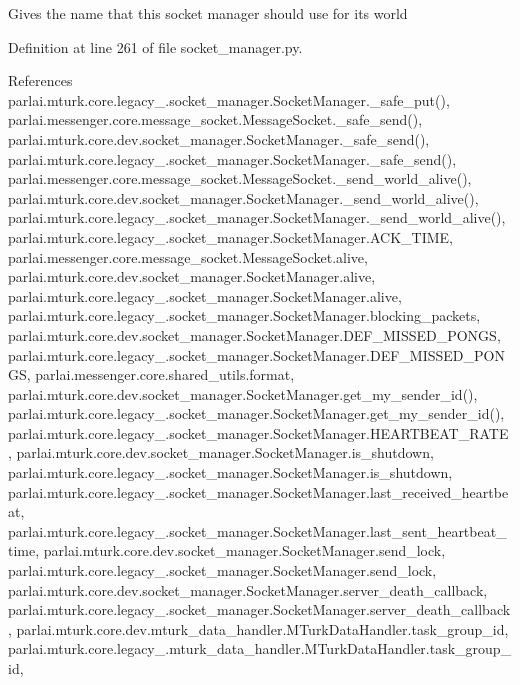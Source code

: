 \begin{DoxyVerb}Gives the name that this socket manager should use for its world\end{DoxyVerb}
 

Definition at line 261 of file socket\+\_\+manager.\+py.



References parlai.\+mturk.\+core.\+legacy\+\_.\+socket\+\_\+manager.\+Socket\+Manager.\+\_\+safe\+\_\+put(), parlai.\+messenger.\+core.\+message\+\_\+socket.\+Message\+Socket.\+\_\+safe\+\_\+send(), parlai.\+mturk.\+core.\+dev.\+socket\+\_\+manager.\+Socket\+Manager.\+\_\+safe\+\_\+send(), parlai.\+mturk.\+core.\+legacy\+\_.\+socket\+\_\+manager.\+Socket\+Manager.\+\_\+safe\+\_\+send(), parlai.\+messenger.\+core.\+message\+\_\+socket.\+Message\+Socket.\+\_\+send\+\_\+world\+\_\+alive(), parlai.\+mturk.\+core.\+dev.\+socket\+\_\+manager.\+Socket\+Manager.\+\_\+send\+\_\+world\+\_\+alive(), parlai.\+mturk.\+core.\+legacy\+\_.\+socket\+\_\+manager.\+Socket\+Manager.\+\_\+send\+\_\+world\+\_\+alive(), parlai.\+mturk.\+core.\+legacy\+\_.\+socket\+\_\+manager.\+Socket\+Manager.\+A\+C\+K\+\_\+\+T\+I\+ME, parlai.\+messenger.\+core.\+message\+\_\+socket.\+Message\+Socket.\+alive, parlai.\+mturk.\+core.\+dev.\+socket\+\_\+manager.\+Socket\+Manager.\+alive, parlai.\+mturk.\+core.\+legacy\+\_.\+socket\+\_\+manager.\+Socket\+Manager.\+alive, parlai.\+mturk.\+core.\+legacy\+\_.\+socket\+\_\+manager.\+Socket\+Manager.\+blocking\+\_\+packets, parlai.\+mturk.\+core.\+dev.\+socket\+\_\+manager.\+Socket\+Manager.\+D\+E\+F\+\_\+\+M\+I\+S\+S\+E\+D\+\_\+\+P\+O\+N\+GS, parlai.\+mturk.\+core.\+legacy\+\_.\+socket\+\_\+manager.\+Socket\+Manager.\+D\+E\+F\+\_\+\+M\+I\+S\+S\+E\+D\+\_\+\+P\+O\+N\+GS, parlai.\+messenger.\+core.\+shared\+\_\+utils.\+format, parlai.\+mturk.\+core.\+dev.\+socket\+\_\+manager.\+Socket\+Manager.\+get\+\_\+my\+\_\+sender\+\_\+id(), parlai.\+mturk.\+core.\+legacy\+\_.\+socket\+\_\+manager.\+Socket\+Manager.\+get\+\_\+my\+\_\+sender\+\_\+id(), parlai.\+mturk.\+core.\+legacy\+\_.\+socket\+\_\+manager.\+Socket\+Manager.\+H\+E\+A\+R\+T\+B\+E\+A\+T\+\_\+\+R\+A\+TE, parlai.\+mturk.\+core.\+dev.\+socket\+\_\+manager.\+Socket\+Manager.\+is\+\_\+shutdown, parlai.\+mturk.\+core.\+legacy\+\_.\+socket\+\_\+manager.\+Socket\+Manager.\+is\+\_\+shutdown, parlai.\+mturk.\+core.\+legacy\+\_.\+socket\+\_\+manager.\+Socket\+Manager.\+last\+\_\+received\+\_\+heartbeat, parlai.\+mturk.\+core.\+legacy\+\_.\+socket\+\_\+manager.\+Socket\+Manager.\+last\+\_\+sent\+\_\+heartbeat\+\_\+time, parlai.\+mturk.\+core.\+dev.\+socket\+\_\+manager.\+Socket\+Manager.\+send\+\_\+lock, parlai.\+mturk.\+core.\+legacy\+\_.\+socket\+\_\+manager.\+Socket\+Manager.\+send\+\_\+lock, parlai.\+mturk.\+core.\+dev.\+socket\+\_\+manager.\+Socket\+Manager.\+server\+\_\+death\+\_\+callback, parlai.\+mturk.\+core.\+legacy\+\_.\+socket\+\_\+manager.\+Socket\+Manager.\+server\+\_\+death\+\_\+callback, parlai.\+mturk.\+core.\+dev.\+mturk\+\_\+data\+\_\+handler.\+M\+Turk\+Data\+Handler.\+task\+\_\+group\+\_\+id, parlai.\+mturk.\+core.\+legacy\+\_.\+mturk\+\_\+data\+\_\+handler.\+M\+Turk\+Data\+Handler.\+task\+\_\+group\+\_\+id, 